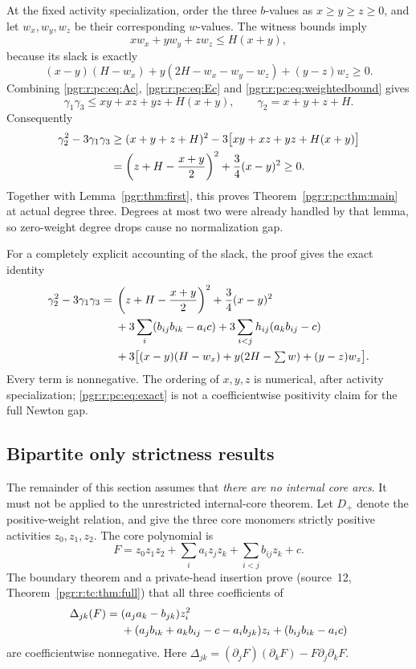 \documentclass[11pt]{article}
\numberwithin{equation}{section}
\theoremstyle{definition}\newtheorem{definition}[theorem]{Definition}\newtheorem{remark}[theorem]{Remark}
\begin{document}
At the fixed activity specialization, order the three $b$-values as
$x\ge y\ge z\ge0$, and let $w_x,w_y,w_z$ be their corresponding $w$-values.
The witness bounds imply
\begin{equation}\label{pgr:r:pc:eq:weightedbound}
 xw_x+yw_y+zw_z\le H(x+y),
\end{equation}
because its slack is exactly
\begin{equation}\label{pgr:r:pc:eq:slack}
 (x-y)(H-w_x)+y(2H-w_x-w_y-w_z)+(y-z)w_z\ge0.
\end{equation}
Combining \eqref{pgr:r:pc:eq:Ac}, \eqref{pgr:r:pc:eq:Ec} and \eqref{pgr:r:pc:eq:weightedbound} gives
\[
 \gamma_1\gamma_3\le xy+xz+yz+H(x+y),\qquad
 \gamma_2=x+y+z+H.
\]
Consequently
\begin{align}\label{pgr:r:pc:eq:twosquares}
 \gamma_2^2-3\gamma_1\gamma_3
 &\ge(x+y+z+H)^2-3\bigl[xy+xz+yz+H(x+y)\bigr]\notag\\
 &=\left(z+H-\frac{x+y}{2}\right)^2+\frac34(x-y)^2\ge0.
\end{align}
Together with Lemma~\ref{pgr:thm:first}, this proves Theorem~\ref{pgr:r:pc:thm:main} at
actual degree three. Degrees at most two were already handled by that lemma,
so zero-weight degree drops cause no normalization gap.

For a completely explicit accounting of the slack, the proof gives the exact
identity
\begin{align}\label{pgr:r:pc:eq:exact}
 \gamma_2^2-3\gamma_1\gamma_3={}&
 \left(z+H-\frac{x+y}{2}\right)^2+\frac34(x-y)^2\notag\\
 &+3\sum_i(b_{ij}b_{ik}-a_ic)
   +3\sum_{i<j}h_{ij}(a_kb_{ij}-c)\notag\\
 &+3\bigl[(x-y)(H-w_x)+y(2H-\textstyle\sum w)
                                  +(y-z)w_z\bigr].
\end{align}
Every term is nonnegative. The ordering of $x,y,z$ is numerical, after
activity specialization; \eqref{pgr:r:pc:eq:exact} is not a coefficientwise positivity
claim for the full Newton gap.

\subsection{Bipartite only strictness results}\label{pgr:r:pc:sec:strictness}
The remainder of this section assumes that \emph{there are no internal core
arcs}. It must not be applied to the unrestricted internal-core theorem.
Let $D_+$ denote the positive-weight relation, and give the three core
monomers strictly positive activities $z_0,z_1,z_2$. The core polynomial is
\[
 F=z_0z_1z_2+\sum_i a_i z_jz_k+\sum_{i<j}b_{ij}z_k+c.
\]
The boundary theorem and a private-head insertion prove (source~12, Theorem~\ref{pgr:r:tc:thm:full})
that all three coefficients of
\begin{align}\label{pgr:r:pc:eq:rayleigh}
 \Delta_{jk}(F)={}&(a_ja_k-b_{jk})z_i^2\notag\\
 &+(a_jb_{ik}+a_kb_{ij}-c-a_ib_{jk})z_i+(b_{ij}b_{ik}-a_ic)
\end{align}
are coefficientwise nonnegative. Here
$\Delta_{jk}=(\partial_jF)(\partial_kF)-F\partial_j\partial_kF$.
\end{document}

